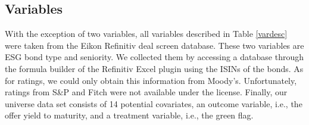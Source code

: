 \subsection{Variables}

With the exception of two variables, all variables described in Table \ref{vardesc} were taken from the Eikon Refinitiv deal screen database. These two variables are ESG bond type and seniority. We collected them by accessing a database through the formula builder of the Refinitiv Excel plugin using the ISINs of the bonds. As for ratings, we could only obtain this information from Moody's. Unfortunately, ratings from S\&P and Fitch were not available under the license. Finally, our universe data set consists of 14 potential covariates, an outcome variable, i.e., the offer yield to maturity, and a treatment variable, i.e., the green flag.

